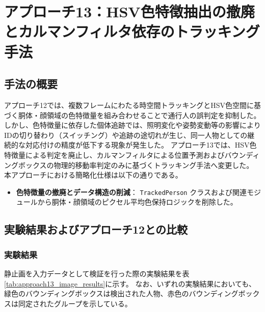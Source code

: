 \section{アプローチ13：HSV色特徴抽出の撤廃とカルマンフィルタ依存のトラッキング手法}

\subsection{手法の概要}
アプローチ12では、複数フレームにわたる時空間トラッキングとHSV色空間に基づく胴体・顔領域の色特徴量を組み合わせることで通行人の誤判定を抑制した。
しかし、色特徴量に依存した個体追跡では、照明変化や姿勢変動等の影響によりIDの切り替わり（スイッチング）や追跡の途切れが生じ、同一人物としての継続的な対応付けの精度が低下する現象が発生した。
アプローチ13では、HSV色特徴量による判定を廃止し、カルマンフィルタによる位置予測およびバウンディングボックスの物理的移動率判定のみに基づくトラッキング手法へ変更した。
本アプローチにおける簡略化仕様は以下の通りである。

\begin{itemize}
    \item \textbf{色特徴量の撤廃とデータ構造の削減}：
    \texttt{TrackedPerson} クラスおよび関連モジュールから胴体・顔領域のピクセル平均色保持ロジックを削除した。
\end{itemize}

\subsection{実験結果およびアプローチ12との比較}

\subsubsection{実験結果}
静止画を入力データとして検証を行った際の実験結果を表\ref{tab:approach13_image_results}に示す。
なお、いずれの実験結果においても、緑色のバウンディングボックスは検出された人物、赤色のバウンディングボックスは同定されたグループを示している。

